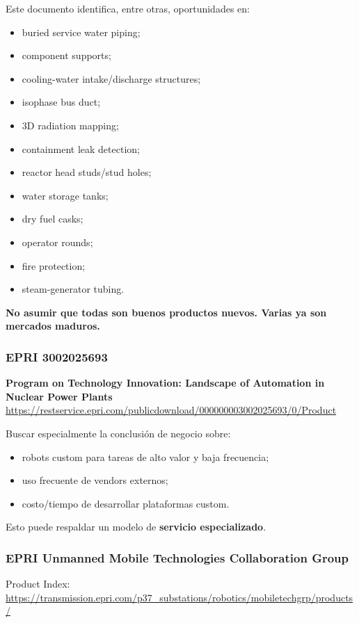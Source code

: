 \documentclass[11pt,a4paper]{article}
\begin{document}
Este documento identifica, entre otras, oportunidades en:

\begin{itemize}
\item buried service water piping;
\item component supports;
\item cooling-water intake/discharge structures;
\item isophase bus duct;
\item 3D radiation mapping;
\item containment leak detection;
\item reactor head studs/stud holes;
\item water storage tanks;
\item dry fuel casks;
\item operator rounds;
\item fire protection;
\item steam-generator tubing.
\end{itemize}

\textbf{No asumir que todas son buenos productos nuevos. Varias ya son mercados maduros.}


\subsubsection*{EPRI 3002025693}
\textbf{Program on Technology Innovation: Landscape of Automation in Nuclear Power Plants} \\
\url{https://restservice.epri.com/publicdownload/000000003002025693/0/Product}

Buscar especialmente la conclusión de negocio sobre:

\begin{itemize}
\item robots custom para tareas de alto valor y baja frecuencia;
\item uso frecuente de vendors externos;
\item costo/tiempo de desarrollar plataformas custom.
\end{itemize}

Esto puede respaldar un modelo de \textbf{servicio especializado}.


\subsubsection*{EPRI Unmanned Mobile Technologies Collaboration Group}
Product Index: \\
\url{https://transmission.epri.com/p37_substations/robotics/mobiletechgrp/products/}
\end{document}
